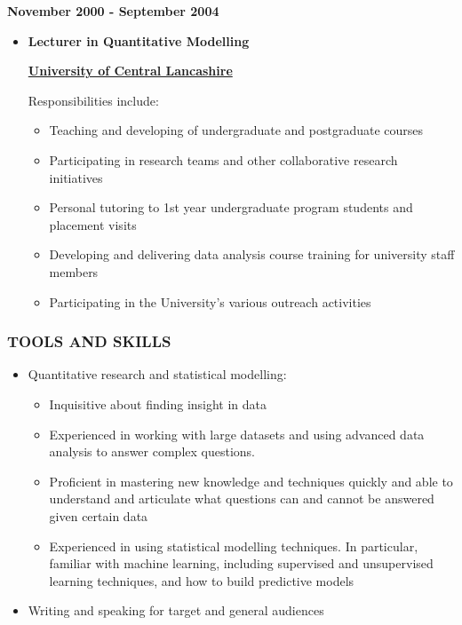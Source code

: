 \documentclass[
]{article}
\providecommand{\tightlist}{%
  \setlength{\itemsep}{0pt}\setlength{\parskip}{0pt}}
\begin{document}
\textbf{November 2000 - September 2004}

\begin{itemize}
\item
  \textbf{Lecturer in Quantitative Modelling}

  \href{https://www.uclan.ac.uk}{\textbf{University of Central
  Lancashire}}

  Responsibilities include:

  \begin{itemize}
  \tightlist
  \item
    Teaching and developing of undergraduate and postgraduate courses
  \item
    Participating in research teams and other collaborative research
    initiatives
  \item
    Personal tutoring to 1st year undergraduate program students and
    placement visits
  \item
    Developing and delivering data analysis course training for
    university staff members
  \item
    Participating in the University's various outreach activities
  \end{itemize}
\end{itemize}

\hypertarget{tools-and-skills}{%
\subsubsection{TOOLS AND SKILLS}\label{tools-and-skills}}

\begin{itemize}
\tightlist
\item
  Quantitative research and statistical modelling:

  \begin{itemize}
  \tightlist
  \item
    Inquisitive about finding insight in data
  \item
    Experienced in working with large datasets and using advanced data
    analysis to answer complex questions.
  \item
    Proficient in mastering new knowledge and techniques quickly and
    able to understand and articulate what questions can and cannot be
    answered given certain data
  \item
    Experienced in using statistical modelling techniques. In
    particular, familiar with machine learning, including supervised and
    unsupervised learning techniques, and how to build predictive models
  \end{itemize}
\item
  Writing and speaking for target and general audiences
\end{itemize}
\end{document}
